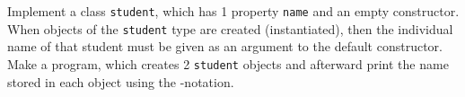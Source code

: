 \label{class:myFirstClass}
Implement a class \lstinline{student}, which has 1 property \lstinline{name} and an empty constructor. When objects of the \lstinline{student} type are created (instantiated), then the individual name of that student must be given as an argument to the default constructor. Make a program, which creates 2 \lstinline{student} objects and afterward print the name stored in each object using the -notation.